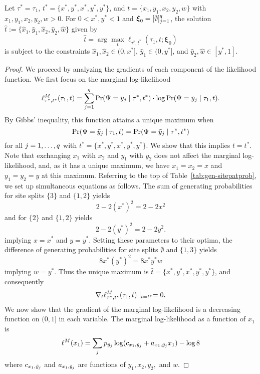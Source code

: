 \begin{lemma}
Let $\tau^*=\tau_1$, $t^*=\{x^*, y^*, x^*, y^*, y^*\}$, and $t=\{x_1, y_1, x_2, y_2, w\}$ with $x_1, y_1, x_2, y_2, w > 0$.
For $0 < x^*, y^* < 1$ and $\boldsymbol\xi_0 = [\emptyset]_{j=1}^q$, the solution $\hat{t} := \{\hat{x}_1,\hat{y}_1,\hat{x}_2,\hat{y}_2,\hat{w}\}$ given by
\[
\hat{t} = \arg\max_t \ell_{\tau^*, t^*}(\tau_1, t; \boldsymbol\xi_0)
\]
is subject to the constraints $\hat{x}_1,\hat{x}_2 \in (0, x^*]$, $\hat{y}_1 \in (0, y^*]$, and $\hat{y}_2,\hat{w} \in [y^*, 1]$.
\label{lemma:bounds}
\end{lemma}

\begin{proof}
We proceed by analyzing the gradients of each component of the likelihood function.
We first focus on the marginal log-likelihood
\[
\ell^M_{\tau^*,t^*}(\tau_1,t) = \sum_{j=1}^q \Pr(\Psi=\tilde{y}_j \mid \tau^*, t^*) \cdot \log \Pr(\Psi=\tilde{y}_j \mid \tau_1, t).
\]
By Gibbs' inequality, this function attains a unique maximum when
\[
\Pr(\Psi=\tilde{y}_j \mid \tau_1, t) = \Pr(\Psi=\tilde{y}_j \mid \tau^*, t^*)
\]
for all $j=1,\ldots,q$ with $t^*=\{x^*,y^*,x^*,y^*,y^*\}$.
We show that this implies $t=t^*$.
Note that exchanging $x_1$ with $x_2$ and $y_1$ with $y_2$ does not affect the marginal log-likelihood, and, as it has a unique maximum, we have $x_1=x_2=x$ and $y_1=y_2=y$ at this maximum.
Referring to the top of Table~\ref{tab:gen-sitepatprob}, we set up simultaneous equations as follows.
The sum of generating probabilities for site splits $\{3\}$ and $\{1,2\}$ yields
\[
2-2(x^*)^2 = 2-2x^2
\]
and for $\{2\}$ and $\{1,2\}$ yields
\[
2-2(y^*)^2 = 2-2y^2.
\]
implying $x=x^*$ and $y=y^*$.
Setting these parameters to their optima, the difference of generating probabilities for site splits $\emptyset$ and $\{1,3\}$ yields
\[
8x^*(y^*)^2 = 8x^*y^*w
\]
implying $w=y^*$.
Thus the unique maximum is $\hat{t}=\{x^*,y^*,x^*,y^*,y^*\}$, and consequently
\[
\nabla_t \ell^M_{\tau^*,t^*}(\tau_1,t) \mid_{t=t^*} = 0.
\]
We now show that the gradient of the marginal log-likelihood is a decreasing function on $(0,1]$ in each variable.
The marginal log-likelihood as a function of $x_1$ is
\begin{align*}
\ell^M(x_1) = \sum_j p_{\tilde{y}_j} \log(c_{x_1,\tilde{y}_j} + a_{x_1,\tilde{y}_j}x_1) - \log 8
\end{align*}
where $c_{x_1,\tilde{y}_j}$ and $a_{x_1,\tilde{y}_j}$ are functions of $y_1,x_2,y_2,$ and $w$.

\end{proof}
